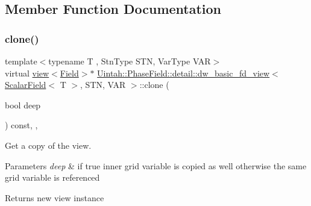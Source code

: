 \subsection{Member Function Documentation}
\mbox{\label{classUintah_1_1PhaseField_1_1detail_1_1dw__basic__fd__view_3_01ScalarField_3_01T_01_4_00_01STN_00_01VAR_01_4_a4eb9e3d89bde232c59088512c30b2ce7}} 
\subsubsection{\texorpdfstring{clone()}{clone()}\hspace{0.1cm}{\footnotesize\ttfamily [1/2]}}
{\footnotesize\ttfamily template$<$typename T , Stn\+Type S\+TN, Var\+Type V\+AR$>$ \\
virtual \hyperlink{classUintah_1_1PhaseField_1_1detail_1_1view}{view}$<$\hyperlink{structUintah_1_1PhaseField_1_1ScalarField}{Field}$>$$\ast$ \hyperlink{classUintah_1_1PhaseField_1_1detail_1_1dw__basic__fd__view}{Uintah\+::\+Phase\+Field\+::detail\+::dw\+\_\+basic\+\_\+fd\+\_\+view}$<$ \hyperlink{structUintah_1_1PhaseField_1_1ScalarField}{Scalar\+Field}$<$ T $>$, S\+TN, V\+AR $>$\+::clone (\begin{DoxyParamCaption}\item[{bool}]{deep }\end{DoxyParamCaption}) const\hspace{0.3cm}{\ttfamily [inline]}, {\ttfamily [override]}, {\ttfamily [virtual]}}



Get a copy of the view. 


\begin{DoxyParams}{Parameters}
{\em deep} & if true inner grid variable is copied as well otherwise the same grid variable is referenced\\
\hline
\end{DoxyParams}
\begin{DoxyReturn}{Returns}
new view instance 
\end{DoxyReturn}


